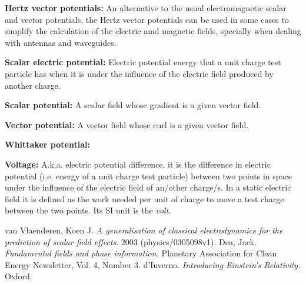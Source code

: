 \documentclass[english]{book}
\begin{document}
\begin{list}{}{}
\begin{list}{}{}
		\item \textbf{Hertz vector potentials:} An alternative to the usual electromagnetic scalar and vector potentials, the Hertz vector potentials can be used in some cases to simplify the calculation of the electric amd magnetic fields, specially when dealing with antennas and waveguides.
		
		\item \textbf{Scalar electric potential:} Electric potential energy that a unit charge test particle has when it is under the influence of the electric field produced by another charge.
		
		\item \textbf{Scalar potential:} A scalar field whose gradient is a given vector field.
		
		\item \textbf{Vector potential:} A vector field whose curl is a given vector field.
		
		\item \textbf{Whittaker potential:} 
	\end{list}
	
	
	\item \textbf{Voltage:} A.k.a. electric potential difference, it is the difference in electric potential (i.e. energy of a unit charge test particle) between two points in space under the influence of the electric field of an/other charge/s. In a static electric field it is defined as the work needed per unit of charge to move a test charge between the two points. Its SI unit is the \emph{volt}.
\end{list}


\begin{thebibliography}{99}
	 van Vlaenderen, Koen J. \emph{A generalisation of classical electrodynamics for the prediction of scalar field effects}. 2003 (physics/0305098v1).
	 Dea, Jack. \emph{Fundamental fields and phase information.} Planetary Association for Clean Energy Newsletter, Vol. 4, Number 3.
	 d'Inverno. \emph{Introducing Einstein's Relativity.} Oxford.
\end{thebibliography}
\end{document}
